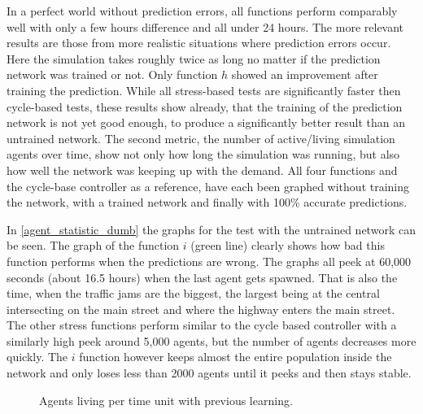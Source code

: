 In a perfect world without prediction errors, all functions perform comparably well with only a few hours difference and all under 24 hours. The more relevant results are those from more realistic situations where prediction errors occur. Here the simulation takes roughly twice as long no matter if the prediction network was trained or not. Only function $h$ showed an improvement after training the prediction. While all stress-based tests are significantly faster then cycle-based tests, these results show already, that the training of the prediction network is not yet good enough, to produce a significantly better result than an untrained network.
The second metric, the number of active/living simulation agents over time, show not only how long the simulation was running, but also how well the network was keeping up with the demand. All four functions and the cycle-base controller as a reference, have each been graphed without training the network, with a trained network and finally with 100\% accurate predictions.

In \autoref{agent_statistic_dumb} the graphs for the test with the untrained network can be seen. The graph of the function $i$ (green line) clearly shows how bad this function performs when the predictions are wrong. The graphs all peek at 60,000 seconds (about 16.5 hours) when the last agent gets spawned. That is also the time, when the traffic jams are the biggest, the largest being at the central intersecting on the main street and where the highway enters the main street. The other stress functions perform similar to the cycle based controller with a similarly high peek around 5,000 agents, but the number of agents decreases more quickly. The $i$ function however keeps almost the entire population inside the network and only loses less than 2000 agents until it peeks and then stays stable.

\begin{figure}[ht!]
	\centering
	\label{agent_statistic_learned}
	\caption{Agents living per time unit with previous learning.}
\end{figure}


